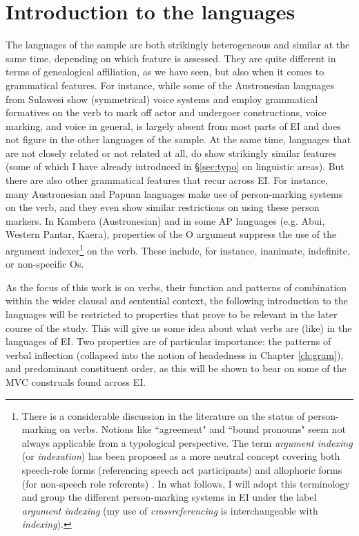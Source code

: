 \section{Introduction to the languages}\label{introlang}

The languages of the sample are both strikingly heterogeneous and similar at the same time, depending on which feature is assessed. They are quite different in terms of genealogical affiliation, as we have seen, but also when it comes to grammatical features. For instance, while some of the Austronesian languages from Sulawesi show (symmetrical) voice systems and employ grammatical formatives on the verb to mark off actor and undergoer constructions, voice marking, and voice in general, is largely absent from most parts of EI and does not figure in the other languages of the sample. At the same time, languages that are not closely related or not related at all, do show strikingly similar features (some of which I have already introduced in §\ref{sec:typo} on linguistic areas). But there are also other grammatical features that recur across EI. For instance, many Austronesian and Papuan languages make use of person-marking systems on the verb, and they even show similar restrictions on using these person markers. In Kambera (Austronesian) and in some AP languages (e.g. Abui, Western Pantar, Kaera), properties of the O argument suppress the use of the argument indexer\footnote{There is a considerable discussion in the literature on the status of person-marking on verbs. Notions like ``agreement" and ``bound pronouns" seem not always applicable from a typological perspective. The term \textit{argument indexing} (or \textit{indexation}) has been proposed as a more neutral concept covering both speech-role forms (referencing speech act participants) and allophoric forms (for non-speech role referents) \parencite{haspelmath2013argument}. In what follows, I will adopt this terminology and group the different person-marking systems in EI under the label \textit{argument indexing} (my use of \textit{crossreferencing} is interchangeable with \textit{indexing}).} on the verb. These include, for instance, inanimate, indefinite, or non-specific Os. 

As the focus of this work is on verbs, their function and patterns of combination within the wider clausal and sentential context, the following introduction to the languages will be restricted to properties that prove to be relevant in the later course of the study. This will give us some idea about what verbs are (like) in the languages of EI. Two properties are of particular importance: the patterns of verbal inflection (collapsed into the notion of headedness in Chapter \ref{ch:gram}), and predominant constituent order, as this will be shown to bear on some of the MVC construals found across EI.

